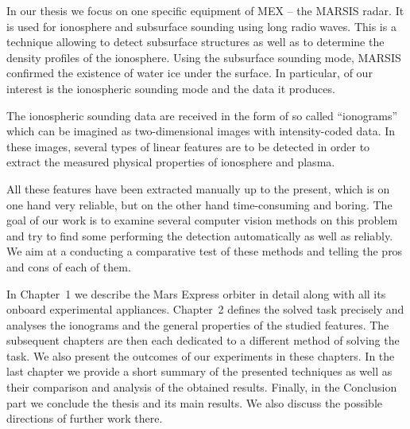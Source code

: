 In our thesis we focus on one specific equipment of MEX -- the MARSIS radar. It is used for ionosphere and subsurface sounding using long radio waves. This is a technique allowing to detect subsurface structures as well as to determine the density profiles of the ionosphere. Using the subsurface sounding mode, MARSIS confirmed the existence of water ice under the surface. In particular, of our interest is the ionospheric sounding mode and the data it produces.

The ionospheric sounding data are received in the form of so called ``ionograms'' which can be imagined as two-dimensional images with intensity-coded data. In these images, several types of linear features are to be detected in order to extract the measured physical properties of ionosphere and plasma.

All these features have been extracted manually up to the present, which is on one hand very reliable, but on the other hand time-consuming and boring. The goal of our work is to examine several computer vision methods on this problem and try to find some performing the detection automatically as well as reliably. We aim at a conducting a comparative test of these methods and telling the pros and cons of each of them.

In Chapter~1 we describe the Mars Express orbiter in detail along with all its onboard experimental appliances. Chapter~2 defines the solved task precisely and analyses the ionograms and the general properties of the studied features. The subsequent chapters are then each dedicated to a different method of solving the task. We also present the outcomes of our experiments in these chapters. In the last chapter we provide a short summary of the presented techniques as well as their comparison and analysis of the obtained results. Finally, in the Conclusion part we conclude the thesis and its main results. We also discuss the possible directions of further work there.
